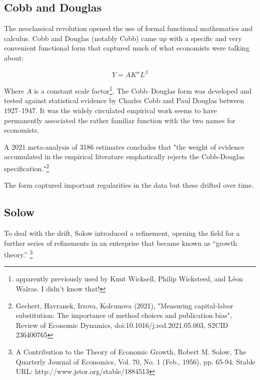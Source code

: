  \subsection{Cobb and Douglas}
 The neoclassical revolution opened the use of formal functional mathematics and calculus. Cobb and Douglas (notably Cobb) came up with a specific and very convenient functional form that captured much of what economists were talking about:
 
 \[Y=AK^\alpha L^\beta\]
 
 Where $A$ is a constant scale factor\footnote {apparently previously used by Knut Wicksell, Philip Wicksteed, and L\'eon Walras. I didn't know that!}. The Cobb–Douglas form was developed and tested against statistical evidence by Charles Cobb and Paul Douglas between 1927–1947. It was  the widely circulated empirical work seems to have permanently associated the rather familiar function with the two names for economists.
 
 A 2021 meta-analysis of 3186 estimates concludes that "the weight of evidence accumulated in the empirical literature emphatically rejects the Cobb-Douglas specification."\footnote{Gechert, Havranek, Irsova, Kolcunova (2021), "Measuring capital-labor substitution: The importance of method choices and publication bias", Review of Economic Dynamics, doi:10.1016/j.red.2021.05.003, S2CID 236400765}
 
 The form captured  important regularities in the data but these drifted over time. 
 
 
 
 \subsection{Solow}
To deal with the drift, Solow introduced a refinement, opening the field for a further series of refinements  in an enterprise that became known as ``growth theory.'' \footnote{A Contribution to the Theory of Economic Growth,  Robert M. Solow, The Quarterly Journal of Economics, Vol. 70, No. 1 (Feb., 1956), pp. 65-94. Stable URL: http://www.jstor.org/stable/1884513}

